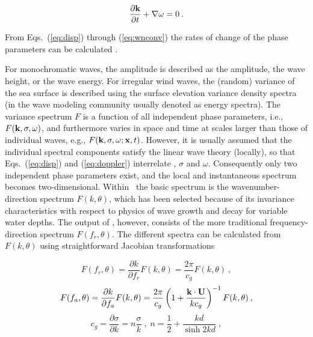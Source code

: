 
\begin{equation}
\frac{\partial {\bk}}{\partial t} + \nabla \omega = 0 \: .
\label{eq:wnconv}
\end{equation}


From Eqs.~(\ref{eq:disp}) through (\ref{eq:wnconv}) the rates of change of the
phase parameters can be calculated \citep[e.g.,][equations not reproduced
here]{rep:Chr82,bk:Mei83,tol:JPO90}.

For monochromatic waves, the amplitude is described as the amplitude, the wave
height, or the wave energy. For irregular wind waves, the (random) variance of
the sea surface is described using the surface elevation variance density spectra (in the wave
modeling community usually denoted as energy spectra). The variance spectrum
$F$ is a function of all independent phase parameters, i.e.,
$F({\mbox{\bf k}},\sigma,\omega)$, and furthermore varies in space and time at scales
larger than those of individual waves, e.g., $F({\mbox{\bf k}},\sigma,\omega
;\mbox{\bf x},t)$. However, it is usually assumed that the individual spectral
components satisfy the linear wave theory (locally), so that
Eqs.~(\ref{eq:disp}) and (\ref{eq:doppler}) interrelate {\bk}, $\sigma$ and
$\omega$. Consequently only two independent phase parameters exist, and the
local and instantaneous spectrum becomes two-dimensional. Within \ws\ the
basic spectrum is the wavenumber-direction spectrum $F(k,\theta)$, which has
been selected because of its invariance characteristics with respect to
physics of wave growth and decay for variable water depths. The output of \ws,
however, consists of the more traditional frequency-direction spectrum
$F(f_r,\theta)$. The different spectra can be calculated from $F(k,\theta)$
using straightforward Jacobian transformations


\begin{equation}
F(f_r,\theta) = \frac{\partial k}{\partial f_r} F(k,\theta) =
\frac{2\pi}{c_g} F(k,\theta) \: ,
\label{eq:jac_fr}
\end{equation}
\begin{equation}
F(f_a,\theta) = \frac{\partial k}{\partial f_a} F(k,\theta) =
\frac{2\pi}{c_g}
\left ( 1 + \frac{{\bk}\cdot{\bf U}}{k c_g}\right )^{-1}
F(k,\theta) \: ,
\label{eq:jac_fa}
\end{equation}
\begin{equation}
c_g = \frac{\partial \sigma}{\partial k} = n \frac{\sigma}{k}
\; , \;
n = \frac{1}{2} + \frac{kd}{\sinh 2kd} \; ,
\label{eq:cg}
\end{equation}

